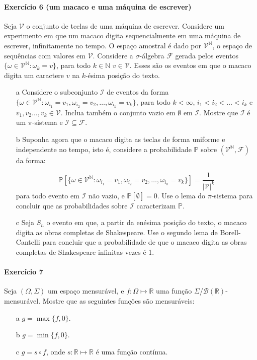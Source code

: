 \documentclass[10pt,a4paper]{article}
\begin{document}
		\paragraph{Exercício 6 (um macaco e uma máquina de escrever)} Seja $\mathcal{V}$ o conjunto de teclas de uma máquina de escrever. Considere um experimento em que um macaco digita sequencialmente em uma máquina de escrever, infinitamente no tempo. O espaço amostral é dado por $\mathcal{V}^{\mathbb{N}}$, o espaço de sequências com valores em $\mathcal{V}$. Considere a $\sigma$-álgebra $\mathcal{F}$ gerada pelos eventos $\{\omega \in \mathcal{V}^{\mathbb{N}}: \omega_k = v\}$, para todo $k \in \mathbb{N}$ $v \in \mathcal{V}$. Esses são os eventos em que o macaco digita um caractere $v$ na $k$-ésima posição do texto.
		\begin{itemize}
			\item[a] Considere o subconjunto $\mathcal{I}$ de eventos da forma $\{\omega \in \mathcal{V}^{\mathbb{N}} : \omega_{i_1} = v_1 , \omega_{i_2} = v_2,\ldots, \omega_{i_k} = v_k\}$, para todo $k<\infty$, $i_1 < i_2 < \ldots < i_k$ e $v_1,v_2\ldots, v_k \in \mathcal{V}$. Inclua também o conjunto vazio em $\emptyset$ em $\mathcal{I}$. Mostre que $\mathcal{I}$ é um $\pi$-sistema e $\mathcal{I}\subseteq \mathcal{F}$.
			\item[b] Suponha agora que o macaco digita as teclas de forma uniforme e independente no tempo, isto é, considere a probabilidade $\mathbb{P}$ sobre $(\mathcal{V}^{\mathbb{N}}, \mathcal{F})$ da forma:
			
			$$\mathbb{P}[\{\omega \in \mathcal{V}^{\mathbb{N}} : \omega_{i_1} = v_1 , \omega_{i_2} = v_2,\ldots, \omega_{i_k} = v_k\}] = \frac{1}{|\mathcal{V}|^k}$$
			para todo evento em $\mathcal{I}$ não vazio, e $\mathbb{P}[\emptyset] = 0$. Use o lema do $\pi$-sistema para concluir que as probabilidades sobre $\mathcal{I}$ caracterizam $\mathbb{P}$.
			\item[c] Seja $S_n$ o evento em que, a partir da enésima posição do texto, o macaco digita as obras completas de Shakespeare. Use o segundo lema de Borell-Cantelli para concluir que a probabilidade de que o macaco digita as obras completas de Shakespeare infinitas vezes é 1.
		\end{itemize}
		
		\paragraph{Exercício 7 } Seja $(\Omega,\Sigma)$ um espaço mensurável, e $f:\Omega\mapsto \mathbb{R}$ uma função $\Sigma$/$\mathcal{B}(\mathbb{R})$-mensurável. Mostre que as seguintes funções são mensuráveis:
		\begin{enumerate}
			\item[a]	$g = \max\{f,0\}$.
			\item[b] $g = \min\{f,0\}$.
			\item[c] $g = s \circ f$, onde $s:\mathbb{R}\mapsto \mathbb{R}$ é uma função contínua.
		\end{enumerate}

		
\end{document}
